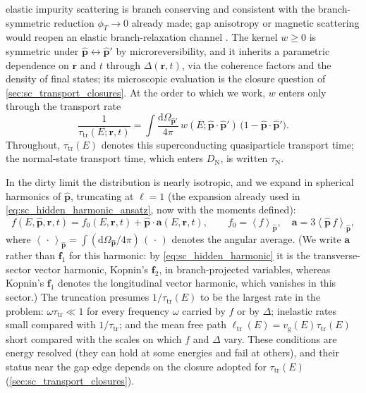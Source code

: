 \documentclass[
  aps,
  prb,
  preprint,
  superscriptaddress,
  longbibliography,
  nofootinbib
]{revtex4-2}
\newcommand{\dd}{\mathrm{d}}
\newcommand{\avg}[1]{\left\langle #1 \right\rangle}
\newcommand{\br}{\mathbf{r}}
\newcommand{\bp}{\mathbf{p}}
\newcommand{\vg}{v_{\mathrm{g}}}
\newcommand{\tautr}{\tau_{\mathrm{tr}}}
\newcommand{\elltr}{\ell_{\mathrm{tr}}}
\newcommand{\DN}{D_{\mathrm{N}}}
\begin{document}
elastic impurity scattering is branch conserving and consistent with the
branch-symmetric reduction \(\phi_T\to0\) already made; gap anisotropy or
magnetic scattering would reopen an elastic branch-relaxation channel
\cite{tinkham2004}. The kernel \(w\ge0\) is symmetric under
\(\hat{\bp}\leftrightarrow\hat{\bp}'\) by microreversibility, and it
inherits a parametric dependence on \(\br\) and \(t\) through
\(\Delta(\br,t)\), via the coherence factors and the density of final
states; its microscopic evaluation is the closure question of
\cref{sec:sc_transport_closures}. At the order to which we work, \(w\)
enters only through the transport rate
\begin{equation}
  \frac{1}{\tautr(E;\br,t)}
  =
  \int\frac{\dd\Omega_{\hat{\bp}'}}{4\pi}\,
  w(E;\hat{\bp}\cdot\hat{\bp}')\,
  \bigl(1-\hat{\bp}\cdot\hat{\bp}'\bigr).
  \label{eq:sc_transport_rate}
\end{equation}
Throughout, \(\tautr(E)\) denotes this superconducting quasiparticle
transport time; the normal-state transport time, which enters
\(\DN\), is written \(\tau_{\mathrm{N}}\).

In the dirty limit the distribution is nearly isotropic, and we expand in
spherical harmonics of \(\hat{\bp}\), truncating at \(\ell=1\) (the
expansion already used in \cref{eq:sc_hidden_harmonic_ansatz}, now with
the moments defined):
\begin{equation}
  f(E,\hat{\bp},\br,t)
  =
  f_{0}(E,\br,t)
  +
  \hat{\bp}\cdot\mathbf{a}(E,\br,t),
  \qquad
  f_{0}=\avg{f}_{\hat{\bp}},
  \quad
  \mathbf{a}=3\avg{\hat{\bp}\,f}_{\hat{\bp}},
  \label{eq:sc_p1_ansatz}
\end{equation}
where \(\avg{\,\cdot\,}_{\hat{\bp}}=\int(\dd\Omega_{\hat{\bp}}/4\pi)\,(\,\cdot\,)\)
denotes the angular average. (We write \(\mathbf{a}\) rather than
\(\mathbf{f}_1\) for this harmonic: by \cref{eq:sc_hidden_harmonic} it
is the transverse-sector vector harmonic, Kopnin's
\(\mathbf{f}_2\), in branch-projected variables, whereas Kopnin's
\(\mathbf{f}_1\) denotes the longitudinal vector harmonic, which
vanishes in this sector.) The truncation presumes \(1/\tautr(E)\) to be
the largest rate in the problem: \(\omega\tautr\ll1\) for every frequency
\(\omega\) carried by \(f\) or by \(\Delta\); inelastic rates small compared
with \(1/\tautr\); and the mean free path \(\elltr(E)=\vg(E)\tautr(E)\)
short compared with the scales on which \(f\) and \(\Delta\) vary. These
conditions are energy resolved (they can hold at some energies and fail at
others), and their status near the gap edge depends on the closure adopted
for \(\tautr(E)\) (\cref{sec:sc_transport_closures}).
\end{document}
